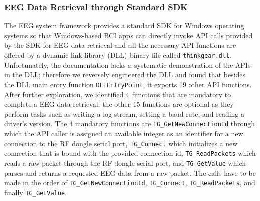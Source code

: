 \subsubsection{EEG Data Retrieval through Standard SDK}
The EEG system framework provides a standard SDK for Windows operating systems so that Windows-based BCI apps can directly invoke API calls provided by the SDK for EEG data retrieval and all the necessary API functions are offered by a dynamic link library (DLL) binary file called \texttt{thinkgear.dll}. Unfortunately, the documentation lacks a systematic demonstration of the APIs in the DLL; therefore we reversely engineered the DLL and found that besides the DLL main entry function \texttt{DLLEntryPoint}, it exports 19 other API functions. After further exploration, we identified 4 functions that are mandatory to complete a EEG data retrieval; the other 15 functions are optional as they perform tasks such as writing a log stream, setting a baud rate, and reading a driver's version. The 4 mandatory functions are \texttt{TG\_GetNewConnectionId} through which the API caller is assigned an available integer as an identifier for a new connection to the RF dongle serial port, \texttt{TG\_Connect} which initializes a new connection that is bound with the provided connection id, \texttt{TG\_ReadPackets} which reads a raw packet through the RF dongle serial port, and \texttt{TG\_GetValue} which parses and returns a requested EEG data from a raw packet. The calls have to be made in the order of \texttt{TG\_GetNewConnectionId}, \texttt{TG\_Connect}, \texttt{TG\_ReadPackets}, and finally \texttt{TG\_GetValue}.

